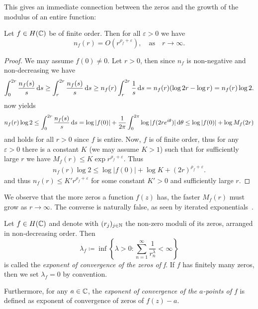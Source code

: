 This gives an immediate connection between the zeros and the growth of the modulus of an entire function:

\begin{lemma} \label{lem:zeros-bounded-by-order}
    Let $f \in H(\mathbb{C})$ be of finite order. Then for all $\varepsilon > 0$ we have
    $$ n_f(r) = O(r^{\rho_f + \varepsilon}), \quad \textrm{as} \quad r \to \infty. $$
\end{lemma}

\begin{proof}
    We may assume $f(0) \neq 0$. Let $r > 0$, then since $n_f$ is non-negative and non-decreasing we have
    \begin{align*}
        \int_0^{2r} \frac{n_f(s)}{s} \mathop{}\!\mathrm{d} s \geq \int_r^{2r} \frac{n_f(s)}{s} \mathop{}\!\mathrm{d} s \geq n_f(r) \int_r^{2r} \frac{1}{s} \mathop{}\!\mathrm{d} s = n_f(r) (\log 2r - \log r) = n_f(r) \log 2.
    \end{align*}
     now yields
    \begin{equation*}
        n_f(r) \log 2 \leq \int_0^{2r} \frac{n_f(s)}{s} \mathop{}\!\mathrm{d} s = \log \vert f(0) \vert + \frac{1}{2\pi} \int_0^{2 \pi} \log \vert f(2r e^{i \theta}) \vert \mathop{}\!\mathrm{d} \theta \leq \log \vert f(0) \vert + \log M_f(2r)
    \end{equation*}
    and holds for all $r > 0$ since $f$ is entire. Now, $f$ is of finite order, thus for any $\varepsilon > 0$ there is a constant $K$ (we may assume $K > 1$) such that for sufficiently large $r$ we have $M_f(r) \leq K \exp {r^{\rho_f + \varepsilon}}$. Thus
    \begin{align*}
        n_f(r) \log 2 \leq \log \vert f(0) \vert + \log K + (2r)^{\rho_f + \varepsilon}.
    \end{align*}
    and thus $n_f(r) \leq K' r^{\rho_f + \varepsilon}$ for some constant $K' > 0$ and sufficiently large $r$.
\end{proof}

We observe that the more zeros a function $f(z)$ has, the faster $M_f(r)$ must grow as $r \to \infty$. The converse is naturally false, as seen by iterated exponentials~\cite{segal-complex-analysis}.

\begin{definition} \label{def:zero-exponent}
    Let $f \in H(\mathbb{C})$ and denote with $(r_j)_{j \in \mathbb{N}}$ the non-zero moduli of its zeros, arranged in non-decreasing order. Then
    $$ \lambda_f \coloneqq \inf \left\{ \lambda > 0 : \sum_{n=1}^\infty \frac{1}{r^\lambda_n} < \infty \right\} $$
    is called the \emph{exponent of convergence of the zeros of f}. If $f$ has finitely many zeros, then we set $\lambda_f = 0$ by convention.

    Furthermore, for any $a \in \mathbb{C}$, the \emph{exponent of convergence of the $a$-points of $f$} is defined as exponent of convergence of zeros of $f(z) - a$.
\end{definition}

